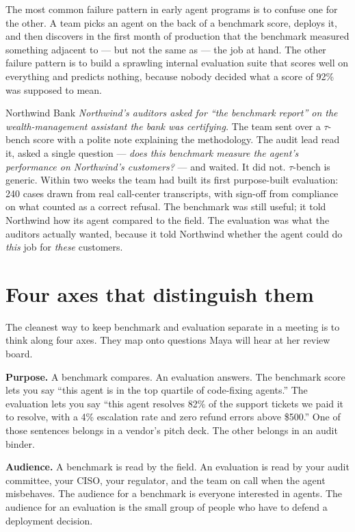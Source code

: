 The most common failure pattern in early agent programs is to confuse one for the other. A team picks an agent on the back of a benchmark score, deploys it, and then discovers in the first month of production that the benchmark measured something adjacent to --- but not the same as --- the job at hand. The other failure pattern is to build a sprawling internal evaluation suite that scores well on everything and predicts nothing, because nobody decided what a score of 92\% was supposed to mean.

\begin{TNinpractice}{Northwind Bank}
\textit{Northwind's auditors asked for ``the benchmark report'' on the wealth-management assistant the bank was certifying.} The team sent over a $\tau$-bench score with a polite note explaining the methodology. The audit lead read it, asked a single question --- \textit{does this benchmark measure the agent's performance on Northwind's customers?} --- and waited. It did not. $\tau$-bench is generic. Within two weeks the team had built its first purpose-built evaluation: 240 cases drawn from real call-center transcripts, with sign-off from compliance on what counted as a correct refusal. The benchmark was still useful; it told Northwind how its agent compared to the field. The evaluation was what the auditors actually wanted, because it told Northwind whether the agent could do \textit{this} job for \textit{these} customers.
\end{TNinpractice}

\section{Four axes that distinguish them}

The cleanest way to keep benchmark and evaluation separate in a meeting is to think along four axes. They map onto questions Maya will hear at her review board.

\textbf{Purpose.} A benchmark compares. An evaluation answers. The benchmark score lets you say ``this agent is in the top quartile of code-fixing agents.'' The evaluation lets you say ``this agent resolves 82\% of the support tickets we paid it to resolve, with a 4\% escalation rate and zero refund errors above \$500.'' One of those sentences belongs in a vendor's pitch deck. The other belongs in an audit binder.

\textbf{Audience.} A benchmark is read by the field. An evaluation is read by your audit committee, your CISO, your regulator, and the team on call when the agent misbehaves. The audience for a benchmark is everyone interested in agents. The audience for an evaluation is the small group of people who have to defend a deployment decision.

